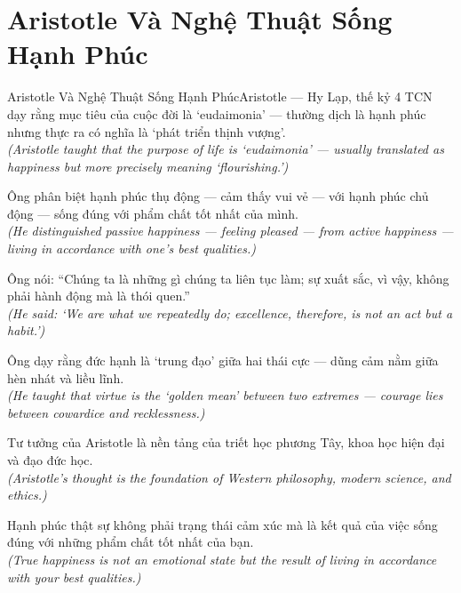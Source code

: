 \section{Aristotle Và Nghệ Thuật Sống Hạnh Phúc}
\begin{truyen}{Aristotle Và Nghệ Thuật Sống Hạnh Phúc}{Aristotle --- Hy Lạp, thế kỷ 4 TCN}
 dạy rằng mục tiêu của cuộc đời là `eudaimonia' --- thường dịch là hạnh phúc nhưng thực ra có nghĩa là `phát triển thịnh vượng'.\\[4pt]
\textit{(Aristotle taught that the purpose of life is `eudaimonia' --- usually translated as happiness but more precisely meaning `flourishing.')}

Ông phân biệt hạnh phúc thụ động --- cảm thấy vui vẻ --- với hạnh phúc chủ động --- sống đúng với phẩm chất tốt nhất của mình.\\[4pt]
\textit{(He distinguished passive happiness --- feeling pleased --- from active happiness --- living in accordance with one's best qualities.)}

Ông nói: ``Chúng ta là những gì chúng ta liên tục làm; sự xuất sắc, vì vậy, không phải hành động mà là thói quen.''\\[4pt]
\textit{(He said: `We are what we repeatedly do; excellence, therefore, is not an act but a habit.')}

Ông dạy rằng đức hạnh là `trung đạo' giữa hai thái cực --- dũng cảm nằm giữa hèn nhát và liều lĩnh.\\[4pt]
\textit{(He taught that virtue is the `golden mean' between two extremes --- courage lies between cowardice and recklessness.)}

Tư tưởng của Aristotle là nền tảng của triết học phương Tây, khoa học hiện đại và đạo đức học.\\[4pt]
\textit{(Aristotle's thought is the foundation of Western philosophy, modern science, and ethics.)}

\end{truyen}
\begin{baihoc}
  Hạnh phúc thật sự không phải trạng thái cảm xúc mà là kết quả của việc sống đúng với những phẩm chất tốt nhất của bạn.\\[4pt]
  \textit{(True happiness is not an emotional state but the result of living in accordance with your best qualities.)}
\end{baihoc}

